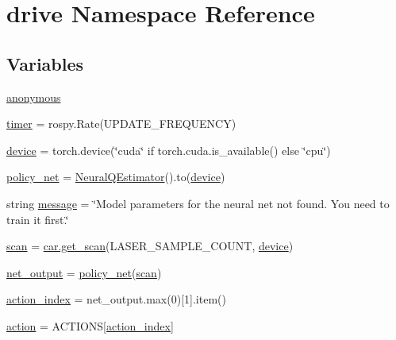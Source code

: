 \hypertarget{namespacedrive}{}\section{drive Namespace Reference}
\label{namespacedrive}
\subsection*{Variables}
\begin{DoxyCompactItemize}
\item 
\hyperlink{namespacedrive_a417833a8f645f1b27a7285408616a9f0}{anonymous}
\item 
\hyperlink{namespacedrive_ad7f80b53042960cd3cf968dee1ebb197}{timer} = rospy.\+Rate(U\+P\+D\+A\+T\+E\+\_\+\+F\+R\+E\+Q\+U\+E\+N\+CY)
\item 
\hyperlink{namespacedrive_a23cc38e06b9fae695cf8845a82fcc273}{device} = torch.\+device(\char`\"{}cuda\char`\"{} if torch.\+cuda.\+is\+\_\+available() else \char`\"{}cpu\char`\"{})
\item 
\hyperlink{namespacedrive_a2e630ff72576502d513dc46034787985}{policy\+\_\+net} = \hyperlink{classparameters_1_1_neural_q_estimator}{Neural\+Q\+Estimator}().to(\hyperlink{namespacedrive_a23cc38e06b9fae695cf8845a82fcc273}{device})
\item 
string \hyperlink{namespacedrive_a82ba3ae0a4aeed9a874c1d9f87e147fd}{message} = \char`\"{}Model parameters for the neural net not found. You need to train it first.\char`\"{}
\item 
\hyperlink{namespacedrive_a082ee6b5d0f5566c851367e7c7792ea5}{scan} = \hyperlink{namespacecar_af96ea5ae50f968d7a2ff6bcc21cad1c2}{car.\+get\+\_\+scan}(L\+A\+S\+E\+R\+\_\+\+S\+A\+M\+P\+L\+E\+\_\+\+C\+O\+U\+NT, \hyperlink{namespacedrive_a23cc38e06b9fae695cf8845a82fcc273}{device})
\item 
\hyperlink{namespacedrive_aa0be36d022218be529fdf22d34a4dfc7}{net\+\_\+output} = \hyperlink{namespacedrive_a2e630ff72576502d513dc46034787985}{policy\+\_\+net}(\hyperlink{namespacedrive_a082ee6b5d0f5566c851367e7c7792ea5}{scan})
\item 
\hyperlink{namespacedrive_a63845082ab90bdcccd95631ad6420392}{action\+\_\+index} = net\+\_\+output.\+max(0)\mbox{[}1\mbox{]}.item()
\item 
\hyperlink{namespacedrive_a68b3f3acb667a1c5e05d3ea265164d7a}{action} = A\+C\+T\+I\+O\+NS\mbox{[}\hyperlink{namespacedrive_a63845082ab90bdcccd95631ad6420392}{action\+\_\+index}\mbox{]}
\end{DoxyCompactItemize}


